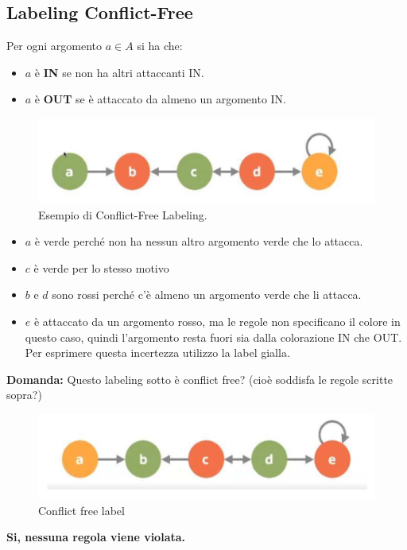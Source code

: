 \subsection{Labeling Conflict-Free}
Per ogni argomento $a \in A$ si ha che:
\begin{itemize}
    \item $a$ è \textbf{IN} se non ha altri attaccanti IN.
    \item $a$ è \textbf{OUT} se è attaccato da almeno un argomento IN.
\end{itemize}
\begin{figure}[H]
    \centering
    \includegraphics[width=12cm, keepaspectratio]{capitoli/img/Cap7/CF.png}
    \caption{Esempio di Conflict-Free Labeling.}
\end{figure}
\begin{itemize}
    \item $a$ è verde perché non ha nessun altro argomento verde che lo
          attacca.
    \item $c$ è verde per lo stesso motivo
    \item $b$ e $d$ sono rossi perché c'è almeno un argomento verde che li
          attacca.
    \item $e$ è attaccato da un argomento rosso, ma le regole non
          specificano il colore in questo caso, quindi l'argomento resta fuori sia
          dalla colorazione IN che OUT. Per esprimere questa incertezza utilizzo
          la label gialla.
\end{itemize}
\textbf{Domanda: } Questo labeling sotto è conflict free? (cioè soddisfa le
regole scritte sopra?)
\begin{figure}[H]
    \centering
    \includegraphics[width=12cm, keepaspectratio]{capitoli/img/Cap7/CF2.png}
    \caption{Conflict free label}
\end{figure}
\begin{center}
    \textbf{Si, nessuna regola viene violata.}
\end{center}

